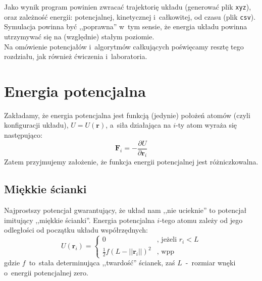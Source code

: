 \documentclass[a4paper,11pt,twoside]{book}
\begin{document}
Jako wynik program powinien zwracać trajektorię układu (generować plik \texttt{xyz}), oraz zależność energii: potencjalnej, kinetycznej i~całkowitej, od czasu (plik \texttt{csv}). Symulacja powinna być ,,poprawna'' w~tym sensie, że energia układu powinna utrzymywać się na (względnie) stałym poziomie. \\

Na omówienie potencjałów i~algorytmów całkujących poświęcamy resztę tego rozdziału, jak również ćwiczenia i~laboratoria.
\section{Energia potencjalna}
Zakładamy, że energia potencjalna jest funkcją (jedynie) położeń atomów (czyli konfiguracji układu), $U=U(\mathbf{r})$, a~siła działająca na $i$-ty atom wyraża się następująco:
\begin{displaymath}
\mathbf{F}_i = -\frac{\partial U}{\partial \mathbf{r}_i}
\end{displaymath}
Zatem przyjmujemy założenie, że funkcja energii potencjalnej jest różniczkowalna.
\subsection{Miękkie ścianki}
Najprostszy potencjał gwarantujący, że układ nam ,,nie ucieknie'' to potencjał imitujący ,,miękkie ścianki''. Energia potencjalna $i$-tego atomu zależy od jego odległości od początku układu współrzędnych:
\begin{displaymath}
U(\mathbf{r}_i) = \left\{ \begin{array}{ll}
0 & \textrm{, jeżeli $r_i<L$}\\
\frac{1}{2}f(L-||\mathbf{r}_i||)^2 & \textrm{, wpp}
\end{array} \right.
\end{displaymath}
gdzie $f$~to~stała determinująca ,,twardość'' ścianek, zaś $L$~-~rozmiar wnęki o~energii potencjalnej zero.
\end{document}
